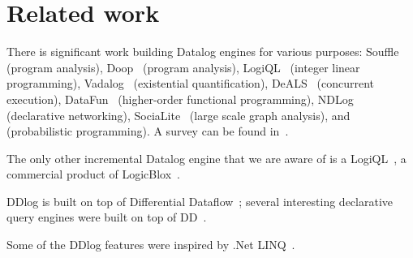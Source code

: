 \section{Related work}

There is significant work building Datalog engines for various
purposes: Souffle~\cite{scholz-cc16} (program analysis),
Doop~\cite{Bravenboer-oopsla09} (program analysis),
LogiQL~\cite{Borraz-Sanchez-dlp18} (integer linear programming),
Vadalog~\cite{Bellomarini-vldb18} (existential quantification),
DeALS~\cite{Yang-vldb17} (concurrent execution),
DataFun~\cite{Arntzenius-icfp16} (higher-order functional
programming), NDLog~\cite{loo-cacm09} (declarative networking),
SociaLite~\cite{Seo-vldb13} (large scale graph analysis),
and~\cite{Barany-tods17} (probabilistic programming).  A survey can be
found in~\cite{Maier-book18}.

The only other incremental Datalog engine that we are aware of is a
LogiQL~\cite{Green-pods15}, a commercial product of
LogicBlox~\cite{Aref-sigmod15}.

DDlog is built on top of Differential Dataflow~\cite{dd}; several
interesting declarative query engines were built on top of
DD~\cite{timely-dataflow,differential-dataflow-paper}.

Some of the DDlog features were inspired by .Net
LINQ~\cite{meijer-dpcool03,Meijer-sigmod06}.
